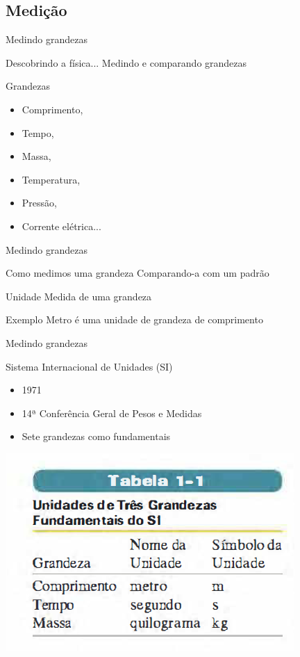 \documentclass[xcolor=dvipsnames,table]{beamer}
\begin{document}
\subsection{Medição}
	\begin{frame}{Medindo grandezas}
		\begin{block}{Descobrindo a física...}
			Medindo e comparando grandezas
		\end{block}
		\begin{block}{Grandezas}
			\begin{itemize}
				\item Comprimento, 
				\item Tempo, 
				\item Massa, 
				\item Temperatura, 
				\item Pressão, 
				\item Corrente elétrica...
			\end{itemize}
		\end{block}
	\end{frame}
	
	\begin{frame}{Medindo grandezas}
		\begin{block}{Como medimos uma grandeza}
			Comparando-a com um padrão
		\end{block}
		\begin{block}{Unidade}
			Medida de uma grandeza
		\end{block}
		\begin{block}{Exemplo}
			Metro é uma unidade de grandeza de comprimento
		\end{block}	
	\end{frame}
	
	\begin{frame}{Medindo grandezas}
		\begin{block}{Sistema Internacional de Unidades (SI)}
			\begin{itemize}
				\item 1971
				\item 14ª Conferência Geral de Pesos e Medidas
				\item Sete grandezas como fundamentais
			\end{itemize}
		\end{block}
		\begin{center}
			\includegraphics[scale=0.5]{images/tabela1-1.png}
		\end{center}
	\end{frame}
	
\end{document}
